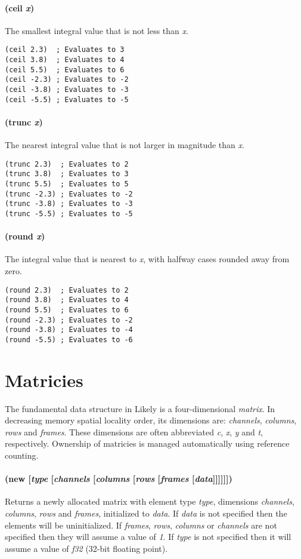 \documentclass[twoside=false, numbers=noenddot]{scrbook}
\begin{document}
\paragraph{(ceil \emph{x})}
The smallest integral value that is not less than \emph{x}.

\begin{verbatim}
(ceil 2.3)  ; Evaluates to 3
(ceil 3.8)  ; Evaluates to 4
(ceil 5.5)  ; Evaluates to 6
(ceil -2.3) ; Evaluates to -2
(ceil -3.8) ; Evaluates to -3
(ceil -5.5) ; Evaluates to -5
\end{verbatim}

\paragraph{(trunc \emph{x})}
The nearest integral value that is not larger in magnitude than \emph{x}.

\begin{verbatim}
(trunc 2.3)  ; Evaluates to 2
(trunc 3.8)  ; Evaluates to 3
(trunc 5.5)  ; Evaluates to 5
(trunc -2.3) ; Evaluates to -2
(trunc -3.8) ; Evaluates to -3
(trunc -5.5) ; Evaluates to -5
\end{verbatim}

\paragraph{(round \emph{x})}
The integral value that is nearest to \emph{x}, with halfway cases rounded away from zero.

\begin{verbatim}
(round 2.3)  ; Evaluates to 2
(round 3.8)  ; Evaluates to 4
(round 5.5)  ; Evaluates to 6
(round -2.3) ; Evaluates to -2
(round -3.8) ; Evaluates to -4
(round -5.5) ; Evaluates to -6
\end{verbatim}

\section{Matricies}
The fundamental data structure in Likely is a four-dimensional \emph{matrix}.
In decreasing memory spatial locality order, its dimensions are: \emph{channels}, \emph{columns}, \emph{rows} and \emph{frames}.
These dimensions are often abbreviated \emph{c}, \emph{x}, \emph{y} and \emph{t}, respectively.
Ownership of matricies is managed automatically using reference counting.

\paragraph{(new [\emph{type} [\emph{channels} [\emph{columns} [\emph{rows} [\emph{frames} [\emph{data}]]]]]])}
Returns a newly allocated matrix with element type \emph{type}, dimensions \emph{channels}, \emph{columns}, \emph{rows} and \emph{frames}, initialized to \emph{data}.
If \emph{data} is not specified then the elements will be uninitialized.
If \emph{frames}, \emph{rows}, \emph{columns} or \emph{channels} are not specified then they will assume a value of \emph{1}.
If \emph{type} is not specified then it will assume a value of \emph{f32} (32-bit floating point).
\end{document}
